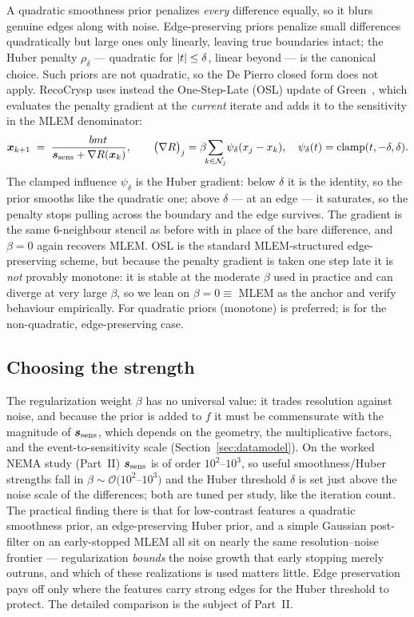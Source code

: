 A quadratic smoothness prior penalizes \emph{every} difference equally, so it
blurs genuine edges along with noise. Edge-preserving priors penalize small
differences quadratically but large ones only linearly, leaving true boundaries
intact; the Huber penalty $\rho_\delta$ --- quadratic for $\left|t\right|\le\delta$, linear
beyond --- is the canonical choice. Such priors are not quadratic, so the De Pierro
closed form does not apply. RecoCrysp uses instead the One-Step-Late (OSL) update
of Green~\cite{green1990}, which evaluates the penalty gradient at the
\emph{current} iterate and adds it to the sensitivity in the MLEM denominator:
\begin{equation}
  \bm{x}_{k+1} \;=\; \frac{\\bm{t}}{\bm{s}_{\mathrm{sens}} + \nabla R(\bm{x}_k)},
  \qquad
  \bigl(\nabla R\bigr)_j = \beta\!\!\sum_{k\in\mathcal N_j}\!\psi_\delta(x_j-x_k),
  \quad
  \psi_\delta(t)=\operatorname{clamp}(t,-\delta,\delta).
  \label{eq:reg-osl}
\end{equation}
The clamped influence $\psi_\delta$ is the Huber gradient: below $\delta$ it is the
identity, so the prior smooths like the quadratic one; above $\delta$ --- at an
edge --- it saturates, so the penalty stops pulling across the boundary and the
edge survives. The gradient is the same 6-neighbour stencil as before with
 in place of the bare difference, and $\beta=0$ again recovers MLEM.
OSL is the standard MLEM-structured edge-preserving scheme, but because the penalty
gradient is taken one step late it is \emph{not} provably monotone: it is stable at
the moderate $\beta$ used in practice and can diverge at very large $\beta$, so we
lean on $\beta=0\equiv$ MLEM as the anchor and verify behaviour empirically. For
quadratic priors  (monotone) is preferred; 
is for the non-quadratic, edge-preserving case.

\subsection{Choosing the strength}
\label{sec:reg:beta}

The regularization weight $\beta$ has no universal value: it trades resolution
against noise, and because the prior is added to $f$ it must be commensurate with
the magnitude of $\bm{s}_{\mathrm{sens}}$, which depends on the geometry, the multiplicative
factors, and the event-to-sensitivity scale (Section~\ref{sec:datamodel}). On the
worked NEMA study (Part~II) $\bm{s}_{\mathrm{sens}}$ is of order $10^2$--$10^3$, so useful
smoothness/Huber strengths fall in $\beta\sim\mathcal O(10^2$--$10^3)$ and the Huber
threshold $\delta$ is set just above the noise scale of the differences;
both are tuned per study, like the iteration count. The practical finding there is
that for low-contrast features a quadratic smoothness prior, an edge-preserving
Huber prior, and a simple Gaussian post-filter on an early-stopped MLEM all sit on
nearly the same resolution--noise frontier --- regularization \emph{bounds} the
noise growth that early stopping merely outruns, and which of these realizations is
used matters little. Edge preservation pays off only where the features carry
strong edges for the Huber threshold to protect. The detailed comparison is the
subject of Part~II.
